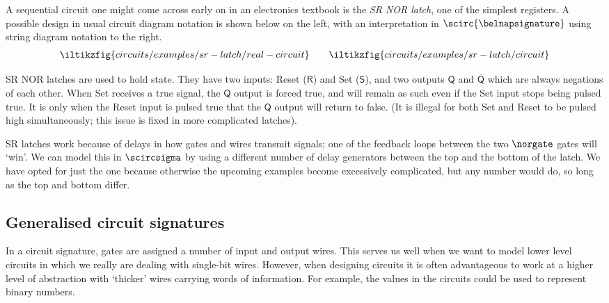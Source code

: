\documentclass{lmcs}
\begin{document}
\begin{exa}[SR latch]\label{ex:sr-latch}
    A sequential circuit one might come across early on in an electronics
    textbook is the \emph{SR NOR latch}, one of the simplest registers.
    A possible design in usual circuit diagram notation is shown below on the
    left, with an interpretation in \(\scirc{\belnapsignature}\) using string
    diagram notation to the right.
    \begin{gather*}
        \iltikzfig{circuits/examples/sr-latch/real-circuit}
        \qquad
        \iltikzfig{circuits/examples/sr-latch/circuit}
    \end{gather*}

    SR NOR latches are used to hold state.
    They have two inputs: Reset (\(\mathsf{R}\)) and Set (\(\mathsf{S}\)), and
    two outputs \(\mathsf{Q}\) and \(\overline{\mathsf{Q}}\) which are always
    negations of each other.
    When Set receives a true signal, the \(\mathsf{Q}\) output is forced true,
    and will remain as such even if the Set input stops being pulsed true.
    It is only when the Reset input is pulsed true that the \(\mathsf{Q}\)
    output will return to false.
    (It is illegal for both Set and Reset to be pulsed high simultaneously; this
    issue is fixed in more complicated latches).

    SR latches work because of delays in how gates and wires transmit signals;
    one of the feedback loops between the two \(\norgate\) gates will `win'.
    We can model this in \(\scircsigma\) by using a different number of delay
    generators between the top and the bottom of the latch.
    We have opted for just the one because otherwise the upcoming examples
    become excessively complicated, but any number would do, so long as the top
    and bottom differ.
\end{exa}

\subsection{Generalised circuit signatures}

In a circuit signature, gates are assigned a number of input and output wires.
This serves us well when we want to model lower level circuits in which we
really are dealing with single-bit wires.
However, when designing circuits it is often advantageous to work at a higher
level of abstraction with `thicker' wires carrying words of information.
For example, the values in the circuits could be used to represent binary
numbers.
\end{document}
